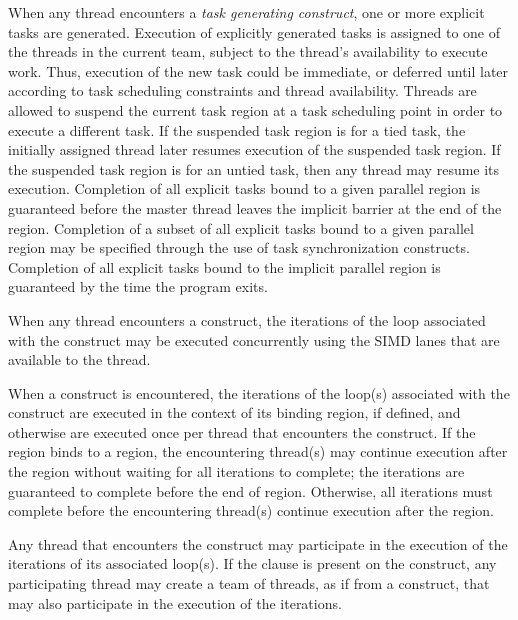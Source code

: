 When any thread encounters a \emph{task generating construct}, one or more explicit tasks are generated.
Execution of explicitly generated tasks is assigned to one of the threads in the current
team, subject to the thread's availability to execute work. Thus, execution of the new
task could be immediate, or deferred until later according to task scheduling constraints
and thread availability. Threads are allowed to suspend the current task region at a task
scheduling point in order to execute a different task. If the suspended task region is for
a tied task, the initially assigned thread later resumes execution of the suspended task
region. If the suspended task region is for an untied task, then any thread may resume its
execution. Completion of all explicit tasks bound to a given parallel region is guaranteed
before the master thread leaves the implicit barrier at the end of the region. Completion
of a subset of all explicit tasks bound to a given parallel region may be specified through
the use of task synchronization constructs. Completion of all explicit tasks bound to the
implicit parallel region is guaranteed by the time the program exits.

When any thread encounters a  construct, the iterations of the loop associated with
the construct may be executed concurrently using the SIMD lanes that are available to
the thread.

When a  construct is encountered, the iterations of the loop(s)
associated with the construct are executed in the context of its binding
region, if defined, and otherwise are executed once per thread that encounters
the construct. If the  region binds to a  region, the
encountering thread(s) may continue execution after the  region
without waiting for all iterations to complete; the iterations are
guaranteed to complete before the end of  region.  Otherwise, all
iterations must complete before the encountering thread(s) continue execution
after the  region.

Any thread that encounters the  construct may participate in the
execution of the iterations of its associated loop(s). If the 
clause is present on the construct, any participating thread may create a
team of threads, as if from a  construct, that may also
participate in the execution of the iterations.




